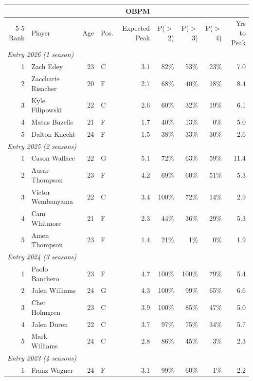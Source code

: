 \begin{table}[htbp]
  \centering\small
  \begin{tabular}{rlrlrrrrr}
    \toprule
     & & & & OBPM & & & & \\
    \cmidrule(lr){5-5}
    Rank & Player & Age & Pos. & Expected Peak & P($>$2) & P($>$3) & P($>$4) & Yrs to Peak \\
    \midrule
    \multicolumn{9}{l}{\textit{Entry 2026 (1 season)}} \\
    \midrule
    1 & Zach Edey & 23 & C & 3.1 & 82\% & 53\% & 23\% & 7.0 \\
    2 & Zaccharie Risacher & 20 & F & 2.7 & 68\% & 40\% & 18\% & 8.4 \\
    3 & Kyle Filipowski & 22 & C & 2.6 & 60\% & 32\% & 19\% & 6.1 \\
    4 & Matas Buzelis & 21 & F & 1.7 & 40\% & 13\% & 0\% & 5.0 \\
    5 & Dalton Knecht & 24 & F & 1.5 & 38\% & 33\% & 30\% & 2.6 \\
    \midrule[0.4pt]
    \multicolumn{9}{l}{\textit{Entry 2025 (2 seasons)}} \\
    \midrule
    1 & Cason Wallace & 22 & G & 5.1 & 72\% & 63\% & 59\% & 11.4 \\
    2 & Ausar Thompson & 23 & F & 4.2 & 69\% & 60\% & 51\% & 5.3 \\
    3 & Victor Wembanyama & 22 & C & 3.4 & 100\% & 72\% & 14\% & 2.9 \\
    4 & Cam Whitmore & 21 & F & 2.3 & 44\% & 36\% & 29\% & 5.3 \\
    5 & Amen Thompson & 23 & F & 1.4 & 21\% & 1\% & 0\% & 1.9 \\
    \midrule[0.4pt]
    \multicolumn{9}{l}{\textit{Entry 2024 (3 seasons)}} \\
    \midrule
    1 & Paolo Banchero & 23 & F & 4.7 & 100\% & 100\% & 79\% & 5.4 \\
    2 & Jalen Williams & 24 & G & 4.3 & 100\% & 99\% & 65\% & 6.6 \\
    3 & Chet Holmgren & 23 & C & 3.9 & 100\% & 85\% & 47\% & 5.0 \\
    4 & Jalen Duren & 22 & C & 3.7 & 97\% & 75\% & 34\% & 5.7 \\
    5 & Mark Williams & 24 & C & 2.8 & 86\% & 45\% & 3\% & 2.3 \\
    \midrule[0.4pt]
    \multicolumn{9}{l}{\textit{Entry 2023 (4 seasons)}} \\
    \midrule
    1 & Franz Wagner & 24 & F & 3.1 & 99\% & 60\% & 1\% & 2.2 \\

\end{tabular}
\end{table}
